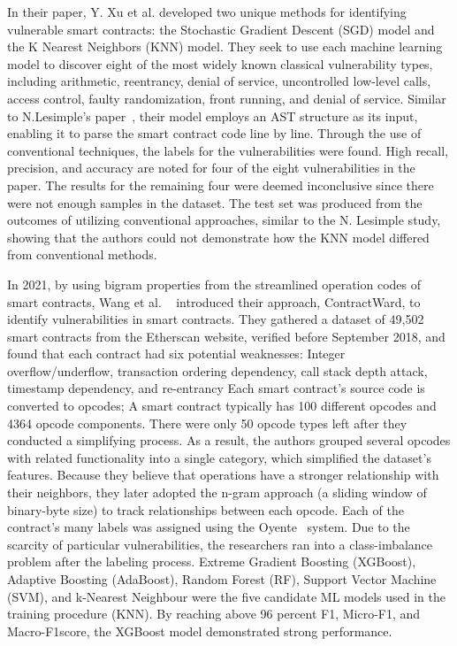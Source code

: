 In their paper, Y. Xu et al. developed two unique methods for identifying vulnerable smart contracts: the Stochastic Gradient Descent (SGD) model and the K Nearest Neighbors (KNN) model.
They seek to use each machine learning model to discover eight of the most widely known classical vulnerability types, including arithmetic, reentrancy, denial of service, uncontrolled low-level calls, access control, faulty randomization, front running, and denial of service.
Similar to N.Lesimple's paper~\cite{he2019learning}, their model employs an AST structure as its input, enabling it to parse the smart contract code line by line.
Through the use of conventional techniques, the labels for the vulnerabilities were found.
High recall, precision, and accuracy are noted for four of the eight vulnerabilities in the paper.
The results for the remaining four were deemed inconclusive since there were not enough samples in the dataset.
The test set was produced from the outcomes of utilizing conventional approaches, similar to the N. Lesimple study, showing that the authors could not demonstrate how the KNN model differed from conventional methods.

In 2021, by using bigram properties from the streamlined operation codes of smart contracts, Wang et al. ~\cite{wang2020contractward} introduced their approach, ContractWard, to identify vulnerabilities in smart contracts.
They gathered a dataset of 49,502 smart contracts from the Etherscan website, verified before September 2018, and found that each contract had six potential weaknesses:
Integer overflow/underflow, transaction ordering dependency, call stack depth attack, timestamp dependency, and re-entrancy
Each smart contract's source code is converted to opcodes; A smart contract typically has 100 different opcodes and 4364 opcode components.
There were only 50 opcode types left after they conducted a simplifying process.
As a result, the authors grouped several opcodes with related functionality into a single category, which simplified the dataset's features.
Because they believe that operations have a stronger relationship with their neighbors, they later adopted the n-gram approach (a sliding window of binary-byte size) to track relationships between each opcode.
Each of the contract's many labels was assigned using the Oyente~\cite{oyente} system.
Due to the scarcity of particular vulnerabilities, the researchers ran into a class-imbalance problem after the labeling process.
Extreme Gradient Boosting (XGBoost), Adaptive Boosting (AdaBoost), Random Forest (RF), Support Vector Machine (SVM), and k-Nearest Neighbour were the five candidate ML models used in the training procedure (KNN).
By reaching above 96 percent F1, Micro-F1, and Macro-F1score, the XGBoost model demonstrated strong performance.

